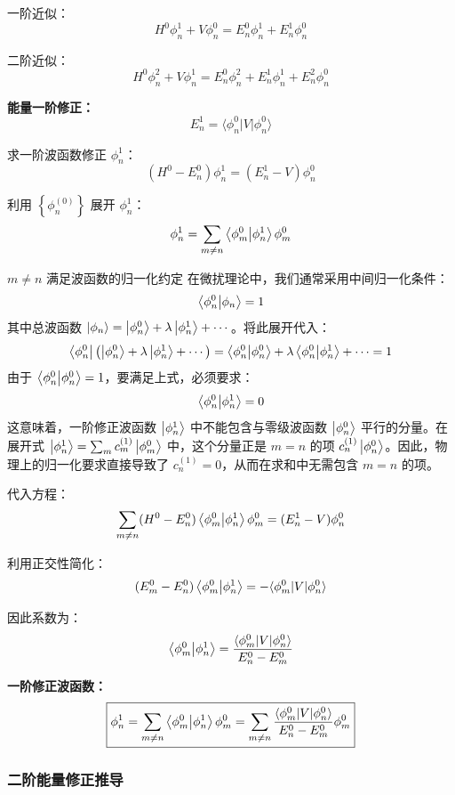 一阶近似：
\[
H^0 \phi_n^1 + V \phi_n^0 = E_n^0 \phi_n^1 + E_n^1 \phi_n^0
\]

二阶近似：
\[
H^0 \phi_n^2 + V \phi_n^1 = E_n^0 \phi_n^2 + E_n^1 \phi_n^1 + E_n^2 \phi_n^0
\]

\textbf{能量一阶修正：}
\[
\boxed{E_n^1 = \langle \phi_n^0 | V | \phi_n^0 \rangle}
\]

求一阶波函数修正 \(\phi_n^1\)：
\[
(H^0 - E_n^0) \phi_n^1 = (E_n^1 - V) \phi_n^0
\]

利用 \(\left\{ \phi_{n}^{(0)} \right\}\) 展开 \(\phi_n^1\)：
\[\phi _n^1 = \sum\limits_{m \ne n} {\bra{\phi _m^0}\ket{\phi _n^1}\phi _m^0} \]
\begin{problembox}{\(m \ne n\) 满足波函数的归一化约定}
	在微扰理论中，我们通常采用中间归一化条件：
	\[
	\braket{\phi_n^0}{\phi_n} = 1
	\]
	其中总波函数 $\ket{\phi_n} = \ket{\phi_n^0} + \lambda \ket{\phi_n^1} + \cdots$。将此展开代入：
	\[
	\bra{\phi_n^0} \bigl( \ket{\phi_n^0} + \lambda \ket{\phi_n^1} + \cdots \bigr) = \braket{\phi_n^0}{\phi_n^0} + \lambda \braket{\phi_n^0}{\phi_n^1} + \cdots = 1
	\]
	由于 $\braket{\phi_n^0}{\phi_n^0} = 1$，要满足上式，必须要求：
	\[
	\braket{\phi_n^0}{\phi_n^1} = 0
	\]
	这意味着，一阶修正波函数 $\ket{\phi_n^1}$ 中不能包含与零级波函数 $\ket{\phi_n^0}$ 平行的分量。在展开式 $\ket{\phi_n^1} = \sum_m c_m^{(1)} \ket{\phi_m^0}$ 中，这个分量正是 $m = n$ 的项 $c_n^{(1)} \ket{\phi_n^0}$。因此，物理上的归一化要求直接导致了 $c_n^{(1)} = 0$，从而在求和中无需包含 $m = n$ 的项。
	
	
\end{problembox}



代入方程：
\[
\sum_{m \neq n} (H^0 - E_n^0) \bra{\phi _m^0}\ket{\phi _n^1} \phi_m^0 = (E_n^1 - V) \phi_n^0
\]

利用正交性简化：
\[
(E_m^0 - E_n^0) \bra{\phi _m^0}\ket{\phi _n^1} = -\langle \phi_m^0 | V | \phi_n^0 \rangle
\]

因此系数为：
\[
\bra{\phi _m^0}\ket{\phi _n^1} = \frac{\langle \phi_m^0 | V | \phi_n^0 \rangle}{E_n^0 - E_m^0}
\]

\textbf{一阶修正波函数：}
\[
\boxed{\phi_n^1 = \sum_{m \neq n} \bra{\phi _m^0}\ket{\phi _n^1} \phi_m^0 = \sum_{m \neq n} \frac{\langle \phi_m^0 | V | \phi_n^0 \rangle}{E_n^0 - E_m^0} \phi_m^0}
\]

\subsubsection{二阶能量修正推导}

